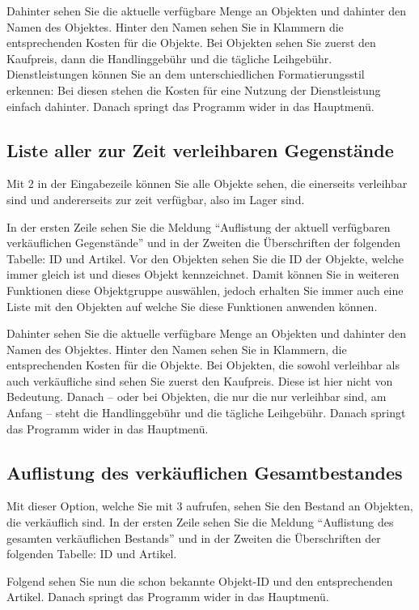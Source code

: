 \documentclass[a4paper,12pt,titlepage]{article}
\begin{document}
Dahinter sehen Sie die aktuelle verfügbare Menge an Objekten und dahinter den Namen des Objektes.
Hinter den Namen sehen Sie in Klammern die entsprechenden Kosten für die Objekte.
Bei Objekten sehen Sie zuerst den Kaufpreis, dann die Handlinggebühr und die tägliche Leihgebühr.
Dienstleistungen können Sie an dem unterschiedlichen Formatierungsstil erkennen:
Bei diesen stehen die Kosten für eine Nutzung der Dienstleistung einfach dahinter.
Danach springt das Programm wider in das Hauptmenü.
\subsection{Liste aller zur Zeit verleihbaren Gegenstände}
Mit 2 in der Eingabezeile können Sie alle Objekte sehen,
 die einerseits verleihbar sind und andererseits zur zeit verfügbar, also im Lager sind.

In der ersten Zeile sehen Sie die Meldung \enquote{Auflistung der aktuell verfügbaren verkäuflichen Gegenstände}
 und in der Zweiten die Überschriften der folgenden Tabelle: ID und Artikel.
Vor den Objekten sehen Sie die ID der Objekte, welche immer gleich ist und dieses Objekt kennzeichnet.
Damit können Sie in weiteren Funktionen diese Objektgruppe auswählen,
 jedoch erhalten Sie immer auch eine Liste mit den Objekten auf welche Sie diese Funktionen anwenden können.

Dahinter sehen Sie die aktuelle verfügbare Menge an Objekten und dahinter den Namen des Objektes.
Hinter den Namen sehen Sie in Klammern, die entsprechenden Kosten für die Objekte.
Bei Objekten, die sowohl verleihbar als auch verkäufliche sind sehen Sie zuerst den Kaufpreis.
Diese ist hier nicht von Bedeutung.
Danach -- oder bei Objekten, die nur die nur verleihbar sind, am Anfang --
steht die Handlinggebühr und die tägliche Leihgebühr.
Danach springt das Programm wider in das Hauptmenü.

\subsection{Auflistung des verkäuflichen Gesamtbestandes}
Mit dieser Option, welche Sie mit 3 aufrufen, sehen Sie den Bestand an Objekten, die verkäuflich sind.
In der ersten Zeile sehen Sie die Meldung \enquote{Auflistung des gesamten verkäuflichen Bestands}
 und in der Zweiten die Überschriften der folgenden Tabelle: ID und Artikel.

Folgend sehen Sie nun die schon bekannte Objekt-ID und den entsprechenden Artikel.
Danach springt das Programm wider in das Hauptmenü.
\end{document}
